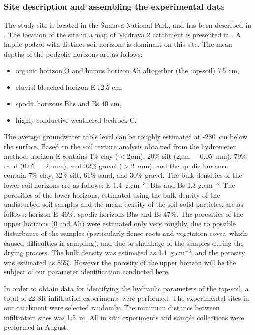\documentclass[review]{myarticle}
\begin{document}
\subsubsection{Site description and assembling the experimental data}%
\label{site}
The study site is located in the \v{S}umava National Park, and has been described in \citep{Jacka1}. The location of the site in a map of Modrava 2 catchment is presented in \citep{Jacka2}.
A haplic podzol with distinct soil horizons is dominant on this site. The mean depths of the podzolic horizons are as follows:
\begin{itemize}
\item organic horizon O and humus horizon Ah altogether (the top-soil) 7.5 cm, 
\item eluvial bleached horizon E 12.5 cm, 
\item spodic horizons Bhs and Bs 40 cm,
\item highly conductive weathered bedrock C.
\end{itemize}
The average groundwater table level can be roughly estimated at -280~cm below the surface. 
Based on the soil texture analysis obtained from the hydrometer method; horizon E contains 1\% clay ($<2\mu$m), 20\% silt ($ 2\mu$m~--~0.05~mm), 79\% sand (0.05~--~2~mm), and 32\% gravel  ($>2$~mm); and the spodic horizons contain 7\% clay, 32\% silt, 61\% sand, and 30\% gravel. The bulk densities of the lower soil horizons are as follows:
E 1.4~g.cm$^{-3}$; Bhs and Bs 1.3 g.cm$^{-3}$. The porosities of the lower horizons, estimated using the bulk density of the undisturbed soil samples and the mean density of the soil solid particles, are as follows: horizon E~46\%, spodic horizons Bhs and Bs 47\%. The porosities of the upper horizons (0 and Ah) were estimated only very roughly, due to  possible disturbance of the samples (particularly dense roots and vegetation cover, which caused difficulties in sampling), and due to shrinkage of the samples during the drying process. The bulk density was estimated as  0.4~g.cm$^{-3}$, and the porosity was estimated as 85\%. However the porosity of the upper horizon will be the subject of our parameter identification conducted here. 








In order to obtain data for identifying the hydraulic parameters of the top-soil, a total of 22 SR infiltration experiments were performed. The experimental sites in our catchment were  selected randomly. The minimum distance between infiltration sites was 1.5~m. All in situ experiments and sample collections were performed in August.
\end{document}
